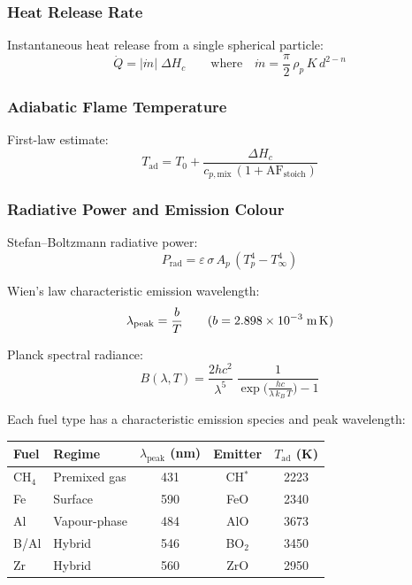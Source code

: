 \documentclass[11pt,a4paper]{article}
\begin{document}
\subsubsection{Heat Release Rate}

Instantaneous heat release from a single spherical particle:
\begin{equation}
  \dot{Q} = \bigl|\dot{m}\bigr|\;\Delta H_{c}
  \qquad\text{where}\quad
  \dot{m} = \frac{\pi}{2}\,\rho_{p}\,K\,d^{2-n}
  \label{eq:qdot}
\end{equation}

\subsubsection{Adiabatic Flame Temperature}

First-law estimate:
\begin{equation}
  T_{\text{ad}} = T_{0} + \frac{\Delta H_{c}}{c_{p,\text{mix}}\,(1 + \text{AF}_{\text{stoich}})}
  \label{eq:Tad}
\end{equation}

\subsubsection{Radiative Power and Emission Colour}

Stefan--Boltzmann radiative power:
\begin{equation}
  P_{\text{rad}} = \varepsilon\,\sigma\,A_{p}\,(T_{p}^{4} - T_{\infty}^{4})
  \label{eq:stefan}
\end{equation}

Wien's law characteristic emission wavelength:
\begin{equation}
  \lambda_{\text{peak}} = \frac{b}{T}
  \qquad (b = 2.898\times10^{-3}\;\text{m\,K})
  \label{eq:wien}
\end{equation}

Planck spectral radiance:
\begin{equation}
  B(\lambda, T) = \frac{2hc^{2}}{\lambda^{5}}
  \;\frac{1}{\exp\!\bigl(\frac{hc}{\lambda\,k_{B}\,T}\bigr) - 1}
  \label{eq:planck}
\end{equation}

Each fuel type has a characteristic emission species and peak wavelength:

\begin{center}
\begin{tabular}{llccc}
\toprule
\textbf{Fuel} & \textbf{Regime} & $\lambda_{\text{peak}}$ (nm) &
\textbf{Emitter} & $T_{\text{ad}}$ (K) \\
\midrule
CH$_{4}$   & Premixed gas  & 431 & CH$^{*}$  & 2223 \\
Fe         & Surface       & 590 & FeO       & 2340 \\
Al         & Vapour-phase  & 484 & AlO       & 3673 \\
B/Al       & Hybrid        & 546 & BO$_{2}$  & 3450 \\
Zr         & Hybrid        & 560 & ZrO       & 2950 \\
\bottomrule
\end{tabular}
\end{center}
\end{document}
